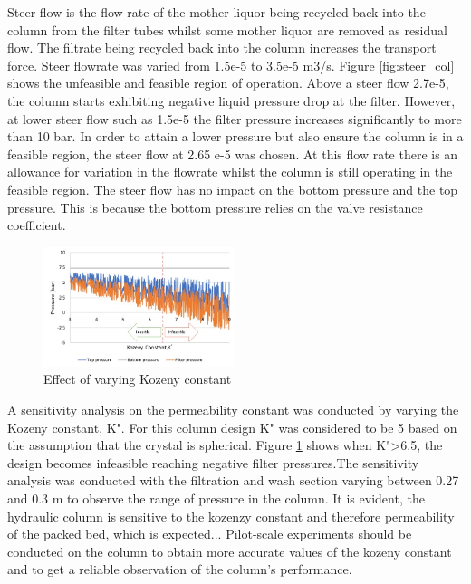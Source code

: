 Steer flow is the flow rate of the mother liquor being recycled back into the column from the filter tubes whilst some mother liquor are removed as residual flow. The filtrate being recycled back into the column increases the transport force. Steer flowrate was varied from 1.5e-5 to 3.5e-5 m3/s. Figure \ref{fig:steer_col} shows the unfeasible and feasible region of operation. Above a steer flow 2.7e-5, the column starts exhibiting negative liquid pressure drop at the filter. However, at lower steer flow such as 1.5e-5 the filter pressure increases significantly to more than 10 bar. In order to attain a lower pressure but also ensure the column is in a feasible region, the steer flow at 2.65 e-5 was chosen. At this flow rate there is an allowance for variation in the flowrate whilst the column is still operating in the feasible region. The steer flow has no impact on the bottom pressure and the top pressure. This is because the bottom pressure relies on the valve resistance coefficient. 

\begin{figure}
\centering
\includegraphics[width=0.5\textwidth]{chapters/3-separation/figures/kozeny.jpg}
\caption{ Effect of varying Kozeny constant}
\label{fig:koz_col}
\end{figure}

A sensitivity analysis on the permeability constant was conducted by varying the Kozeny constant, K". For this column design K" was considered to be 5 based on the assumption that the crystal is spherical. Figure \ref{fig:koz_col} shows when K">6.5, the design becomes infeasible reaching negative filter pressures.The sensitivity analysis was conducted with the filtration and wash section varying between 0.27 and 0.3 m to observe the range of pressure in the column. It is evident, the hydraulic column is sensitive to the kozenzy constant and therefore permeability of the packed bed, which is expected... Pilot-scale experiments should be conducted on the column to obtain more accurate values of the kozeny constant and to get a reliable observation of the column's performance. 

